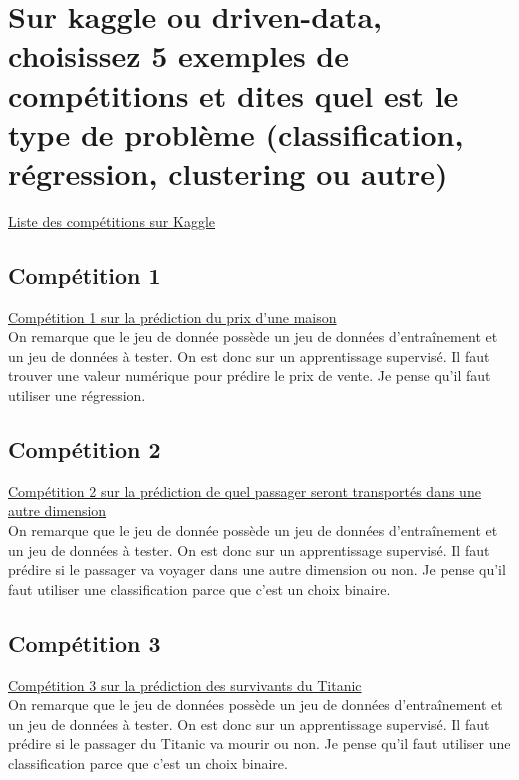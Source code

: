\newpage
\section{Sur kaggle ou driven-data, choisissez 5 exemples de compétitions et dites quel est le type de problème (classification, régression, clustering ou autre)}

\href{https://www.kaggle.com/competitions}{Liste des compétitions sur Kaggle}


\subsection{Compétition 1} 
\href{https://www.kaggle.com/competitions/house-prices-advanced-regression-techniques/data}{Compétition 1 sur la prédiction du prix d'une maison}\\

On remarque que le jeu de donnée possède un jeu de données d’entraînement et un jeu de données à tester. On est donc sur un apprentissage supervisé. Il faut trouver une valeur numérique pour prédire le prix de vente. Je pense qu’il faut utiliser une régression.


\subsection{Compétition 2} 
\href{https://www.kaggle.com/competitions/spaceship-titanic/overview}{Compétition 2 sur la prédiction de quel passager seront transportés dans une autre dimension}\\

On remarque que le jeu de donnée possède un jeu de données d’entraînement et un jeu de données à tester. On est donc sur un apprentissage supervisé. Il faut prédire si le passager va voyager dans une autre dimension ou non. Je pense qu’il faut utiliser une classification parce que c’est un choix binaire.


\subsection{Compétition 3} 
\href{https://www.kaggle.com/competitions/titanic/overview}{Compétition 3 sur la prédiction des survivants du Titanic}\\

On remarque que le jeu de données possède un jeu de données d’entraînement et un jeu de données à tester. On est donc sur un apprentissage supervisé. Il faut prédire si le passager du Titanic va mourir ou non. Je pense qu’il faut utiliser une classification parce que c’est un choix binaire.


